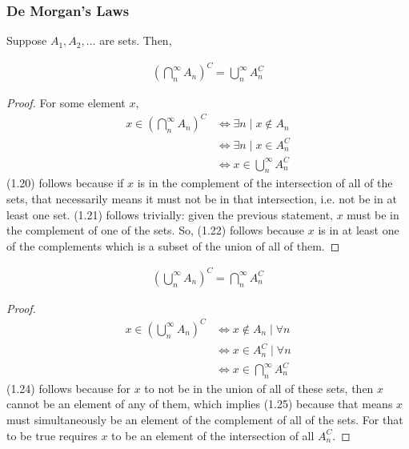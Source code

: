 \subsubsection{De Morgan's Laws}
Suppose $A_1, A_2, ...$ are sets. Then,
\begin{lemma}
    \begin{align}
        \left( \bigcap_n^\infty A_n \right)^C = \bigcup_n^\infty A_n^C
    \end{align}
\end{lemma}
\begin{proof}
    For some element $x$,
    \begin{align}
        x \in \left( \bigcap_n^\infty A_n \right)^C &\iff \exists n \mid x \notin A_n\\
        &\iff \exists n \mid x \in A_n^C \\
        &\iff x \in \bigcup_n^\infty A_n^C
    \end{align}
    (1.20) follows because if $x$ is in the complement of the intersection of all of the sets, that necessarily means it must not be in that intersection, i.e. not be in at least one set. (1.21) follows trivially: given the previous statement, $x$ must be in the complement of one of the sets. So, (1.22) follows because $x$ is in at least one of the complements which is a subset of the union of all of them.
\end{proof}
\begin{lemma}
    \begin{align}
        \left( \bigcup_n^\infty A_n \right)^C = \bigcap_n^\infty A_n^C
    \end{align}
\end{lemma}
\begin{proof}
    \begin{align}
        x \in \left( \bigcup_n^\infty A_n \right)^C &\iff x \notin A_n \mid \forall n\\
        &\iff x \in A_n^C \mid \forall n \\
        &\iff x \in \bigcap_n^\infty A_n^C
    \end{align}
    (1.24) follows because for $x$ to not be in the union of all of these sets, then $x$ cannot be an element of any of them, which implies (1.25) because that means $x$ must simultaneously be an element of the complement of all of the sets. For that to be true requires $x$ to be an element of the intersection of all $A_n^C$.
\end{proof}

